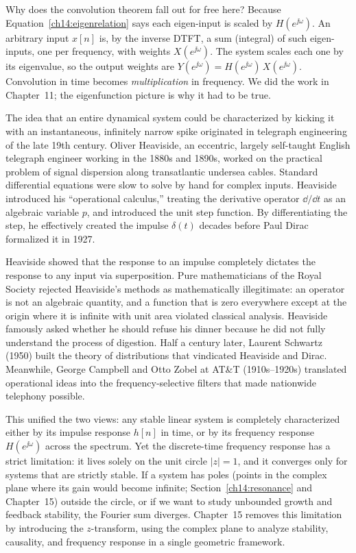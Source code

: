 \begin{whybox}
Why does the convolution theorem fall out for free here? Because
Equation~\eqref{ch14:eigenrelation} says each eigen-input is scaled by
$H(e^{\jj\omega})$. An arbitrary input $x[n]$ is, by the inverse DTFT, a sum
(integral) of such eigen-inputs, one per frequency, with weights
$X(e^{\jj\omega})$. The system scales each one by its eigenvalue, so the output
weights are $Y(e^{\jj\omega}) = H(e^{\jj\omega})\,X(e^{\jj\omega})$.
Convolution in time becomes \emph{multiplication} in frequency. We did the work
in Chapter~11; the eigenfunction picture is why it had to be true.
\end{whybox}

\begin{historybox}
The idea that an entire dynamical system could be characterized by kicking it with an instantaneous,
infinitely narrow spike originated in telegraph engineering of the late 19th century.
Oliver Heaviside, an eccentric, largely self-taught English telegraph engineer working in the 1880s
and 1890s, worked on the practical problem of signal dispersion along transatlantic undersea
cables. Standard differential equations were slow to solve by hand for complex inputs.
Heaviside introduced his ``operational calculus,'' treating the derivative operator
$\dd/\dd t$ as an algebraic variable $p$, and introduced the unit step function. By differentiating
the step, he effectively created the impulse $\delta(t)$ decades before Paul Dirac formalized it in 1927.

Heaviside showed that the response to an impulse completely dictates the response to any input via
superposition. Pure mathematicians of the Royal Society rejected Heaviside's methods as
mathematically illegitimate: an operator is not an algebraic quantity, and a function that is zero everywhere
except at the origin where it is infinite with unit area violated classical analysis. Heaviside famously
asked whether he should refuse his dinner because he did not fully understand the process of digestion.
Half a century later, Laurent Schwartz (1950) built the theory of distributions that vindicated
Heaviside and Dirac. Meanwhile, George Campbell and Otto Zobel at AT\&T (1910s--1920s) translated operational
ideas into the frequency-selective filters that made nationwide telephony possible.

This unified the two views: any stable linear system is completely characterized either by its
impulse response $h[n]$ in time, or by its frequency response $H(e^{\jj\omega})$ across the spectrum.
Yet the discrete-time frequency response has a strict limitation: it lives solely on the unit circle $|z|=1$,
and it converges only for systems that are strictly stable. If a system has poles (points in the complex plane where its gain would become
infinite; Section~\ref{ch14:resonance} and Chapter~15) outside the circle, or if
we want to study unbounded growth and feedback stability, the Fourier sum diverges. Chapter~15
removes this limitation by introducing the $z$-transform, using the complex plane to analyze stability,
causality, and frequency response in a single geometric framework.
\end{historybox}


